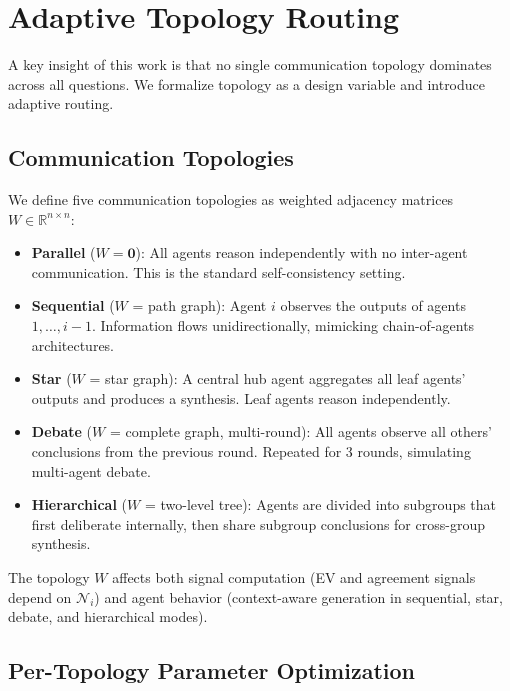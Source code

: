 \section{Adaptive Topology Routing}
\label{sec:topology}

A key insight of this work is that no single communication topology dominates across all questions. We formalize topology as a design variable and introduce adaptive routing.

\subsection{Communication Topologies}

We define five communication topologies as weighted adjacency matrices $W \in \mathbb{R}^{n \times n}$:

\begin{itemize}
    \item \textbf{Parallel} ($W = \mathbf{0}$): All agents reason independently with no inter-agent communication. This is the standard self-consistency setting.
    \item \textbf{Sequential} ($W$ = path graph): Agent $i$ observes the outputs of agents $1, \ldots, i{-}1$. Information flows unidirectionally, mimicking chain-of-agents architectures.
    \item \textbf{Star} ($W$ = star graph): A central hub agent aggregates all leaf agents' outputs and produces a synthesis. Leaf agents reason independently.
    \item \textbf{Debate} ($W$ = complete graph, multi-round): All agents observe all others' conclusions from the previous round. Repeated for 3 rounds, simulating multi-agent debate.
    \item \textbf{Hierarchical} ($W$ = two-level tree): Agents are divided into subgroups that first deliberate internally, then share subgroup conclusions for cross-group synthesis.
\end{itemize}

The topology $W$ affects both signal computation (EV and agreement signals depend on $\mathcal{N}_i$) and agent behavior (context-aware generation in sequential, star, debate, and hierarchical modes).

\subsection{Per-Topology Parameter Optimization}

